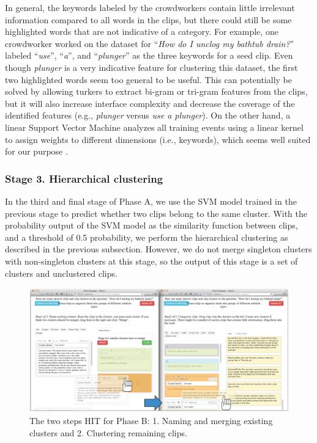 In general,  the keywords labeled by the crowdworkers contain little irrelevant information
compared to all words in the clips, but there could
still be some highlighted words that are not indicative of a category. For
example, one crowdworker worked on the dataset for ``\emph{How do I unclog my
	bathtub drain?}'' labeled ``\emph{use}'', ``\emph{a}'', and ``\emph{plunger}'' as
the three keywords for a seed clip. Even though \emph{plunger} is a very
indicative feature for clustering this dataset, the first two highlighted words
seem too general to be useful. This can potentially be solved by allowing turkers to extract
bi-gram or tri-gram features from the clips, but it will also increase interface
complexity and decrease the coverage of the identified features (e.g.,
\emph{plunger} versus \emph{use a plunger}). On the other hand, a linear
Support Vector Machine analyzes all training events using a linear kernel to
assign weights to different dimensions (i.e., keywords), which seems well suited for
our purpose \cite{chang2011libsvm, wu2004probability}.

\subsubsection{Stage 3. Hierarchical clustering}

In the third and final stage of Phase A, we use the SVM model trained in the
previous stage to predict whether two clips belong to the same cluster. With
the probability output of the SVM model as the similarity function between
clips, and a threshold of 0.5 probability, we perform the hierarchical
clustering as described in the previous subsection.  However, we do not merge
singleton clusters with non-singleton clusters at this stage, so the output of
this stage is a set of clusters and unclustered clips.

\begin{figure}[!t]
	\centering
	\includegraphics[width=2.1\columnwidth]{images/raw-01.png}
	\caption{The two steps HIT for Phase B: 1. Naming and merging existing
		clusters and 2. Clustering remaining clips.}
	\label{fig:phase2-hit}
\end{figure}


